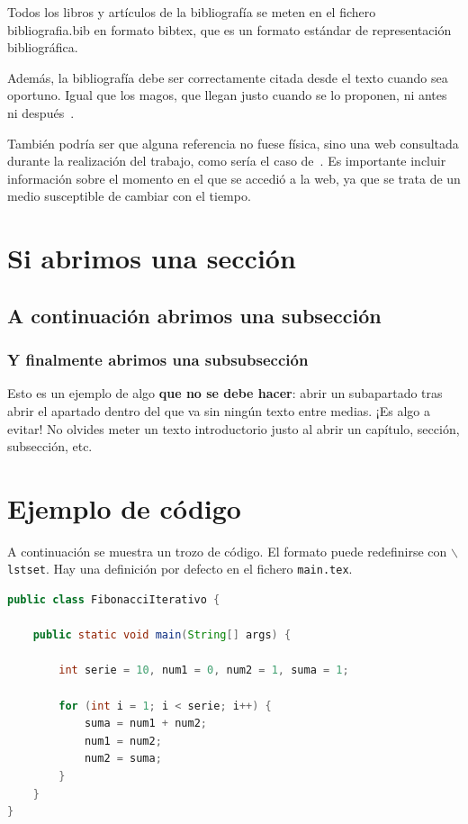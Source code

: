 \documentclass[../main.tex]{subfiles}
\begin{document}
Todos los libros y artículos de la bibliografía se meten en el fichero bibliografia.bib en formato bibtex, que es un formato estándar de representación bibliográfica.

Además, la bibliografía debe ser correctamente citada desde el texto cuando sea oportuno. Igual que los magos, que llegan justo cuando se lo proponen, ni antes ni después~\cite{tolkien}.

También podría ser que alguna referencia no fuese física, sino una web consultada durante la realización del trabajo, como sería el caso de~\cite{z80Decoding}. Es importante incluir información sobre el momento en el que se accedió a la web, ya que se trata de un medio susceptible de cambiar con el tiempo.

\section{Si abrimos una sección}

\subsection{A continuación abrimos una subsección}

\subsubsection{Y finalmente abrimos una subsubsección}

Esto es un ejemplo de algo \textbf{que no se debe hacer}: abrir un subapartado tras abrir el apartado dentro del que va sin ningún texto entre medias. ¡Es algo a evitar! No olvides meter un texto introductorio justo al abrir un capítulo, sección, subsección, etc.

\section{Ejemplo de código}

A continuación se muestra un trozo de código. El formato puede redefinirse con $\backslash$\texttt{lstset}. Hay una definición por defecto en el fichero \texttt{main.tex}.

\begin{lstlisting}[language = Java]
public class FibonacciIterativo {
 
    public static void main(String[] args) {
 
        int serie = 10, num1 = 0, num2 = 1, suma = 1;
         
        for (int i = 1; i < serie; i++) {
            suma = num1 + num2;
            num1 = num2;
            num2 = suma;
        }
    }
}
\end{lstlisting}
\end{document}

